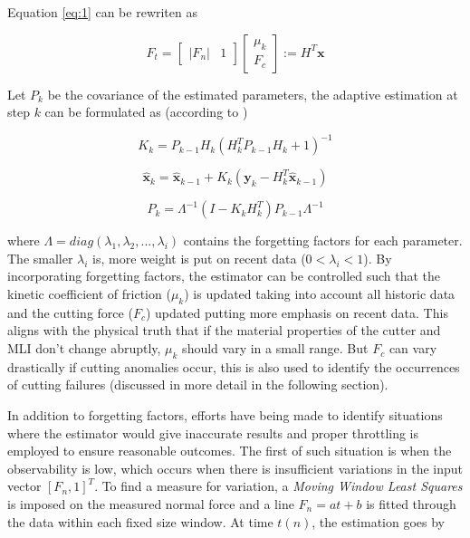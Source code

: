 \documentclass[letterpaper, 10 pt, conference]{ieeeconf}  %
\begin{document}
Equation \ref{eq:1} can be rewriten as 

\begin{equation}
F_t =  \begin{bmatrix} |F_n|  & 1 \end{bmatrix} \begin{bmatrix} \mu_k \\ F_c \end{bmatrix} := H^T\boldsymbol x
\label{eq:2}
\end{equation}

\noindent Let $P_k$ be the covariance of the estimated parameters, the adaptive estimation at step $k$ can be formulated as (according to \cite{forgetfactor})

\begin{equation}
K_k = P_{k-1}H_k(H_k^TP_{k-1}H_k + 1)^{-1}
\label{eq:3}
\end{equation}

\begin{equation}
\hat{\boldsymbol x}_k = \hat{\boldsymbol x}_{k-1}+K_k(\boldsymbol y_k - H_k^T\hat{\boldsymbol x}_{k-1})
\label{eq:4}
\end{equation}

\begin{equation}
P_k = \Lambda^{-1}(I - K_kH_k^T)P_{k-1}\Lambda^{-1}
\label{eq:5}
\end{equation}


\noindent where $\Lambda = diag(\lambda_1, \lambda_2, ..., \lambda_i)$ contains the forgetting factors for each parameter. The smaller $\lambda_i$ is, more weight is put on recent data  ($0<\lambda_i < 1$). By incorporating forgetting factors, the estimator can be controlled such that the kinetic coefficient of friction ($\mu_k$) is updated taking into account all historic data and the cutting force ($F_c$) updated putting more emphasis on recent data. This aligns with the physical truth that if the material properties of the cutter and MLI don\rq{}t change abruptly, $\mu_k$ should vary in a small range. But $F_c$ can vary drastically if cutting anomalies occur, this is also used to identify the occurrences of cutting failures (discussed in more detail in the following section). 
 
	In addition to forgetting factors, efforts have being made to identify situations where the estimator would give inaccurate results and proper throttling is employed to ensure  reasonable outcomes. The first of such situation is when the observability is low, which occurs when there is insufficient variations in the input vector $[F_n,1]^T$. To find a measure for variation, a \textit{Moving Window Least Squares} is imposed on the  measured normal force and a line $F_n=at+b$ is fitted through the data within each fixed size window. At time $t(n)$, the estimation goes by
	
\end{document}
